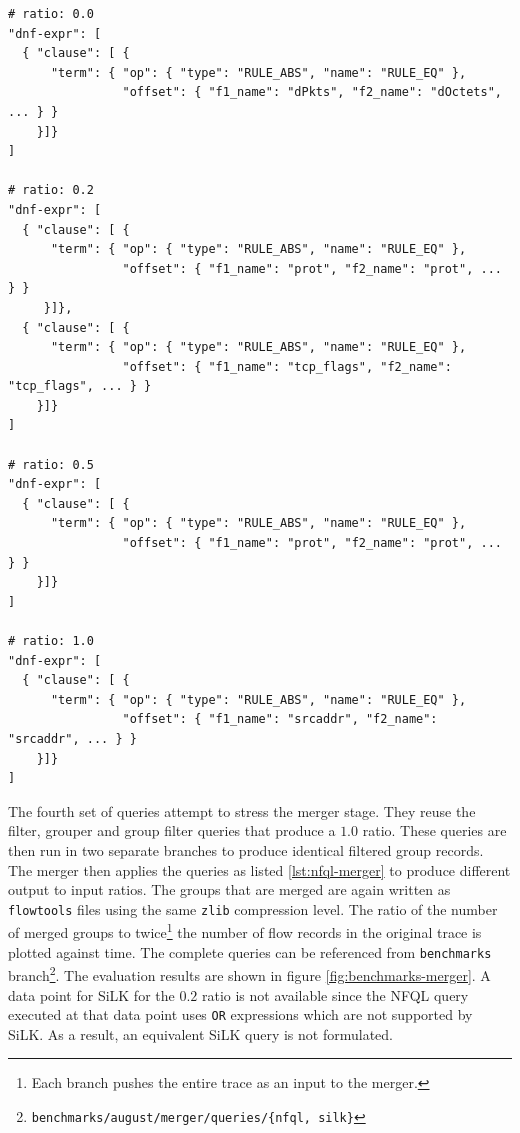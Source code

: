 \begin{lstlisting}
# ratio: 0.0
"dnf-expr": [
  { "clause": [ {
      "term": { "op": { "type": "RULE_ABS", "name": "RULE_EQ" },
                "offset": { "f1_name": "dPkts", "f2_name": "dOctets", ... } }
    }]}
]

# ratio: 0.2
"dnf-expr": [
  { "clause": [ {
      "term": { "op": { "type": "RULE_ABS", "name": "RULE_EQ" },
                "offset": { "f1_name": "prot", "f2_name": "prot", ... } }
     }]},
  { "clause": [ {
      "term": { "op": { "type": "RULE_ABS", "name": "RULE_EQ" },
                "offset": { "f1_name": "tcp_flags", "f2_name": "tcp_flags", ... } }
    }]}
]

# ratio: 0.5
"dnf-expr": [
  { "clause": [ {
      "term": { "op": { "type": "RULE_ABS", "name": "RULE_EQ" },
                "offset": { "f1_name": "prot", "f2_name": "prot", ... } }
    }]}
]

# ratio: 1.0
"dnf-expr": [
  { "clause": [ {
      "term": { "op": { "type": "RULE_ABS", "name": "RULE_EQ" },
                "offset": { "f1_name": "srcaddr", "f2_name": "srcaddr", ... } }
    }]}
]
\end{lstlisting}

The fourth set of queries attempt to stress the merger stage. They reuse the
filter, grouper and group filter queries that produce a $1.0$ ratio. These
queries are then run in two separate branches to produce identical filtered
group records.  The merger then applies the queries as listed
\ref{lst:nfql-merger} to produce different output to input ratios. The groups
that are merged are again written as \texttt{flowtools} files
 using the same \texttt{zlib} compression
level. The ratio of the number of merged groups to twice\footnote{Each branch
pushes the entire trace as an input to the merger.} the number of flow records
in the original trace is plotted against time.  The complete queries can be
referenced from \texttt{benchmarks}
branch\footnote{\texttt{benchmarks/august/merger/queries/\{nfql, silk\}}}.
The evaluation results are shown in figure \ref{fig:benchmarks-merger}.
A data point for SiLK for the $0.2$ ratio is not available since the \ac{NFQL}
query executed at that data point uses \texttt{OR} expressions which are not
supported by SiLK. As a result, an equivalent SiLK query is not formulated.

